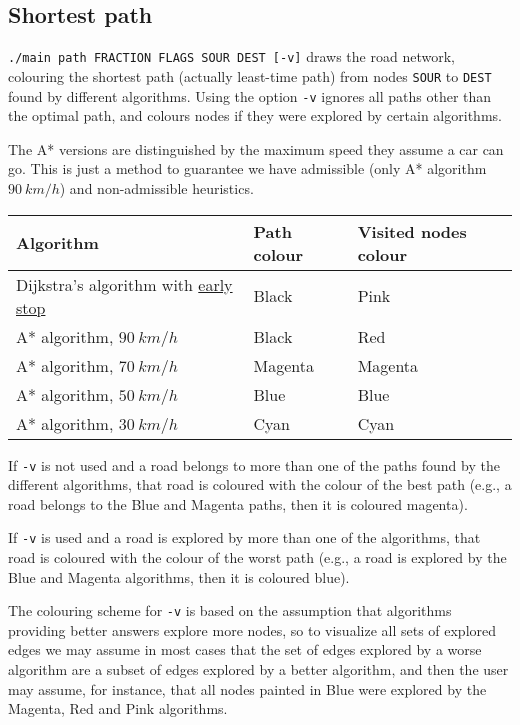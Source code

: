 \subsection{Shortest path}
\texttt{./main path FRACTION FLAGS SOUR DEST [-v]} draws the road network, colouring the shortest path (actually least-time path) from nodes \texttt{SOUR} to \texttt{DEST} found by different algorithms. Using the option \texttt{-v} ignores all paths other than the optimal path, and colours nodes if they were explored by certain algorithms.\par
The A* versions are distinguished by the maximum speed they assume a car can go. This is just a method to guarantee we have admissible (only A* algorithm $\SI{90}{km/h}$) and non-admissible heuristics.
\begin{center}
    \begin{tabular}{l | l | l}
        \textbf{Algorithm}            & \textbf{Path colour} & \textbf{Visited nodes colour} \\ \hline
        Dijkstra's algorithm with \hyperref[alg:dijkstra-early-stop]{early stop} & Black                & Pink                          \\
        A* algorithm, $\SI{90}{km/h}$ & Black                & Red                           \\
        A* algorithm, $\SI{70}{km/h}$ & Magenta              & Magenta                       \\
        A* algorithm, $\SI{50}{km/h}$ & Blue                 & Blue                          \\
        A* algorithm, $\SI{30}{km/h}$ & Cyan                 & Cyan                          
    \end{tabular}
\end{center}
If \texttt{-v} is not used and a road belongs to more than one of the paths found by the different algorithms, that road is coloured with the colour of the best path (e.g., a road belongs to the Blue and Magenta paths, then it is coloured magenta).\par
If \texttt{-v} is used and a road is explored by more than one of the algorithms, that road is coloured with the colour of the worst path (e.g., a road is explored by the Blue and Magenta algorithms, then it is coloured blue).\par
The colouring scheme for \texttt{-v} is based on the assumption that algorithms providing better answers explore more nodes, so to visualize all sets of explored edges we may assume in most cases that the set of edges explored by a worse algorithm are a subset of edges explored by a better algorithm, and then the user may assume, for instance, that all nodes painted in Blue were explored by the Magenta, Red and Pink algorithms.\par
